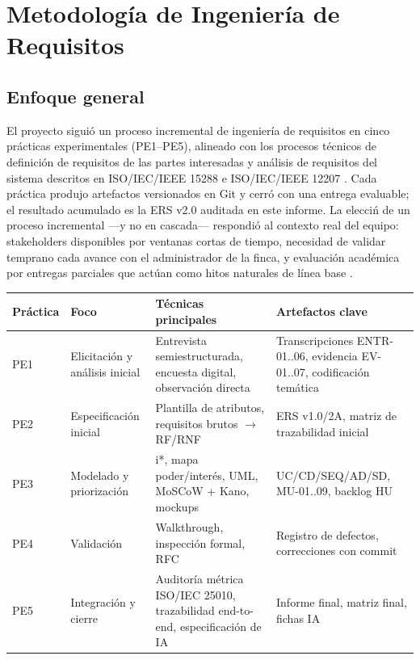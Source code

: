 \section{Metodolog\'ia de Ingenier\'ia de Requisitos}
\label{sec:metodologia-ir}

\subsection{Enfoque general}

El proyecto sigui\'o un proceso incremental de ingenier\'ia de requisitos en cinco pr\'acticas experimentales (PE1--PE5), alineado con los procesos t\'ecnicos de definici\'on de requisitos de las partes interesadas y an\'alisis de requisitos del sistema descritos en ISO/IEC/IEEE 15288 e ISO/IEC/IEEE 12207 \cite{iso15288,iso12207}. Cada pr\'actica produjo artefactos versionados en Git y cerr\'o con una entrega evaluable; el resultado acumulado es la ERS v2.0 auditada en este informe. La elecci\'n de un proceso incremental ---y no en cascada--- respondi\'o al contexto real del equipo: stakeholders disponibles por ventanas cortas de tiempo, necesidad de validar temprano cada avance con el administrador de la finca, y evaluaci\'on acad\'emica por entregas parciales que act\'uan como hitos naturales de l\'inea base \cite{pohl2025}.

\begin{center}
\begin{tabular}{@{}p{1.6cm}@{\;}p{4.4cm}@{\;}p{5.2cm}@{\;}p{3.2cm}@{}}
\hline
\textbf{Pr\'actica} & \textbf{Foco} & \textbf{T\'ecnicas principales} & \textbf{Artefactos clave} \\
\hline
PE1 & Elicitaci\'on y an\'alisis inicial & Entrevista semiestructurada, encuesta digital, observaci\'on directa & Transcripciones ENTR-01..06, evidencia EV-01..07, codificaci\'on tem\'atica \\
\hline
PE2 & Especificaci\'on inicial & Plantilla de atributos, requisitos brutos $\rightarrow$ RF/RNF & ERS v1.0/2A, matriz de trazabilidad inicial \\
\hline
PE3 & Modelado y priorizaci\'on & i*, mapa poder/inter\'es, UML, MoSCoW + Kano, mockups & UC/CD/SEQ/AD/SD, MU-01..09, backlog HU \\
\hline
PE4 & Validaci\'on & Walkthrough, inspecci\'on formal, RFC & Registro de defectos, correcciones con commit \\
\hline
PE5 & Integraci\'on y cierre & Auditor\'ia m\'etrica ISO/IEC 25010, trazabilidad end-to-end, especificaci\'on de IA & Informe final, matriz final, fichas IA \\
\hline
\end{tabular}
\end{center}

